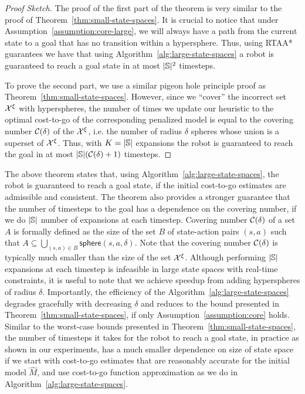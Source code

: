 \begin{proof}[Proof Sketch]
  The proof of the first part of the theorem is very similar to the
proof of Theorem~\ref{thm:small-state-spaces}. It is crucial to notice
that under Assumption~\ref{assumption:core-large}, we will always have
a path from the current state to a goal that has no transition
within a hypersphere. Thus, using RTAA* guarantees we have that using
Algorithm~\ref{alg:large-state-spaces} a robot is guaranteed to reach
a goal state in at most $|\mathbb{S}|^2$ timesteps.

To prove the second part, we use a similar pigeon hole principle proof
as Theorem~\ref{thm:small-state-spaces}. However, since we ``cover''
the incorrect set $\mathcal{X}^\xi$ with hyperspheres, the number of
times we update our heuristic to the optimal cost-to-go of the
corresponding penalized model is equal to the covering number $\mathcal{C}(\delta)$ of the
$\mathcal{X}^\xi$, i.e. the number of radius $\delta$ spheres whose
union is a superset of $\mathcal{X}^\xi$. Thus, with $K =
|\mathbb{S}|$ expansions the robot is guaranteed to reach the goal in
at most $|\mathbb{S}|(\mathcal{C}(\delta) + 1)$ timesteps.
\end{proof}

The above theorem states
that, using
Algorithm~\ref{alg:large-state-spaces}, the robot is guaranteed to
reach a goal state, if the initial cost-to-go estimates are admissible
and consistent. The theorem also provides a stronger guarantee that the number of timesteps
to the goal has a dependence on the covering
number, if we do $|\mathbb{S}|$ number of expansions at each timestep.
Covering number
$\mathcal{C}(\delta)$ of a set $A$ is formally defined as the size of
the set $B$ of
state-action pairs $(s, a)$ such that $A \subseteq \bigcup_{(s, a) \in
  B} \mathsf{sphere}(s, a, \delta)$. Note that the covering number
$\mathcal{C}(\delta)$ is
typically much smaller than the size of the set
$\mathcal{X}^\xi$. Although performing $|\mathbb{S}|$ expansions at
each timestep is infeasible in large state spaces with real-time
constraints, it is useful to note that we achieve speedup from adding
hyperspheres of radius $\delta$. Importantly, the efficiency
of the Algorithm~\ref{alg:large-state-spaces} degrades gracefully with
decreasing $\delta$ and reduces to the bound presented in
Theorem~\ref{thm:small-state-spaces}, if only
Assumption~\ref{assumption:core} holds. Similar to the
worst-case bounds presented in Theorem~\ref{thm:small-state-spaces},
the number of timesteps it takes for the robot to reach a goal state,
in practice as shown in our experiments, has a much smaller dependence on size of state space if
we start with cost-to-go estimates that are reasonably accurate for
the initial model $\hat{M}$, and use cost-to-go
function approximation as we do in
Algorithm~\ref{alg:large-state-spaces}.

